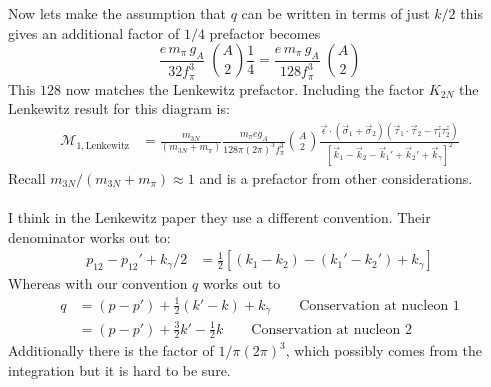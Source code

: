 \documentclass[11pt]{article}
\newcommand{\M}{\mathcal{M}}
\newcommand\ddfrac[2]{\frac{\displaystyle #1}{\displaystyle #2}}
\begin{document}
Now lets make the assumption that $q$ can be written in terms of just $k/2$ this gives an additional factor of $1/4$ prefactor becomes
\begin{equation}
    \frac{e\, m_\pi\, g_A}{32 f_\pi^3}\;\binom{A}{2} \frac{1}{4} =\frac{e\, m_\pi\, g_A}{128 f_\pi^3}\;\binom{A}{2}
\end{equation}
This $128$ now matches the Lenkewitz prefactor.
Including the factor $K_{2N}$ the Lenkewitz result for this diagram is:
\begin{align}
    \M_{1,\text{Lenkewitz}}&=\frac{m_{3N}}{\left( m_{3N} + m_\pi \right)}  \frac{m_\pi e g_A }{128 \pi  \left( 2\pi \right)^3 f_\pi^3  }   \binom{A}{2}
    \ddfrac{\vec{\epsilon} \cdot (\vec{\sigma}_1 + \vec{\sigma}_2)
    \left( \vec{\tau}_1 \cdot \vec{\tau}_2 - \tau_1^z \tau_2^z \right)  }
    {
        \left[\vec{k}_1 - \vec{k}_2 -  \vec{k}_1' + \vec{k}_2' + \vec{k}_\gamma\right]^2
    } 
\end{align}
Recall $m_{3N}/(m_{3N}+m_\pi)\approx1$ and is a prefactor from other considerations.\\~\\
I think in the Lenkewitz paper they use a different convention. Their denominator works out to:
\begin{align}
    p_{12} - p_{12}' + k_\gamma/2&= \frac{1}{2} \left[ \left( k_1-k_2 \right)  -  \left( k_1' - k_2' \right) + k_\gamma \right]
\end{align}
Whereas with our convention $q$ works out to
\begin{align}
    q&= \left( p-p' \right) + \frac{1}{2} \left( k'-k \right) +k_\gamma\qquad \text{Conservation at nucleon 1}\\
     &= \left( p-p'\right) + \frac{3}{2} k' - \frac{1}{2} k\qquad \text{Conservation at nucleon 2}
\end{align}
Additionally there is the factor of $1/\pi (2\pi)^3$, which possibly comes from the integration but it is hard to be sure.
\end{document}
